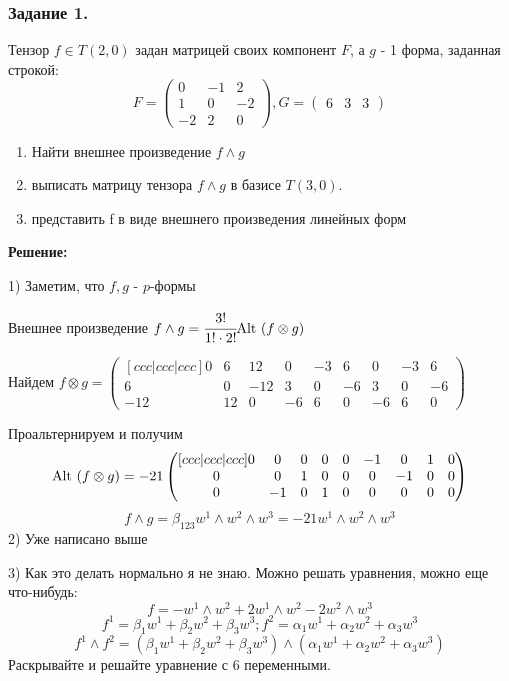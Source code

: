 \subsubsection{Задание 1.}

Тензор $f \in T(2,0)$ задан матрицей своих компонент $F$, а $g$ - 1 форма, заданная строкой:
$$F = \begin{pmatrix}
    0 & -1 & 2\\
    1 & 0 & -2 \\
    -2 & 2 & 0 
\end{pmatrix}, G =\begin{pmatrix}
    6 & 3 & 3
\end{pmatrix} $$
\begin{enumerate}
    \item Найти внешнее произведение $f \wedge g$
    \item выписать матрицу тензора $f \wedge g$ в базисе $T(3,0)$.
    \item представить f в виде внешнего произведения линейных форм
\end{enumerate}

\textbf{Решение:}

1) Заметим, что $f,g$ - $p$-формы

Внешнее произведение $f  \wedge g = \cfrac{3!}{1!\cdot2!}\text{Alt } (f \otimes g)$

Найдем $f \otimes g = \begin{pmatrix}[ccc|ccc|ccc]
    0 &6 &12 &  0 & -3 & 6 & 0 & -3 & 6\\
    6 & 0 & -12 & 3 & 0 &-6 & 3 & 0 & -6\\
    -12 & 12 & 0 & -6 & 6 & 0 & -6 &6 &0
\end{pmatrix}$

Проальтернируем и получим 
$$\text{Alt }(f\otimes g)=-21 \begin{pmatrix}[ccc|ccc|ccc]
    0 & 0 & 0 & 0& 0 & -1 & 0  & 1 &0 \\
    0 & 0 & 1 & 0 & 0 & 0 & -1 &0 & 0\\
    0 & -1 &0 & 1 & 0 & 0 & 0& 0& 0\\
\end{pmatrix}$$
$$f\wedge g = \beta_{123}w^1\wedge w^2 \wedge w^3 = -21w^1\wedge w^2 \wedge w^3
$$
2) Уже написано выше

3) Как это делать нормально я не знаю. Можно решать уравнения, можно еще что-нибудь:
$$f = - w^1 \wedge w^2 +  2 w^1 \wedge w^2 - 2 w^2 \wedge w^3$$
$$f^1 =\beta_1 w^1 + \beta_2 w^2 + \beta_3 w^3; f^2 = \alpha_1 w^1 + \alpha_2 w^2 + \alpha_3w^3$$
$$f^1 \wedge f^2 =(\beta_1 w^1 + \beta_2 w^2 + \beta_3 w^3) \wedge (\alpha_1 w^1 + \alpha_2 w^2 + \alpha_3w^3) $$
Раскрывайте и решайте уравнение с 6 переменными.

